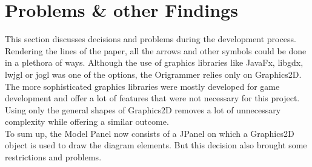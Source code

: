 
\section{Problems \& other Findings}
\label{sec:problems}

This section discusses decisions and problems during the development process.\\
Rendering the lines of the paper, all the arrows and other symbols could be done in a plethora of ways. Although the use of graphics libraries like JavaFx, libgdx, lwjgl or jogl was one of the options, the Origrammer relies only on Graphics2D. The more sophisticated graphics libraries were mostly developed for game development and offer a lot of features that were not necessary for this project. Using only the general shapes of Graphics2D removes a lot of unnecessary complexity while offering a similar outcome.
\\
To sum up, the Model Panel now consists of a JPanel on which a Graphics2D object is used to draw the diagram elements. But this decision also brought some restrictions and problems.


